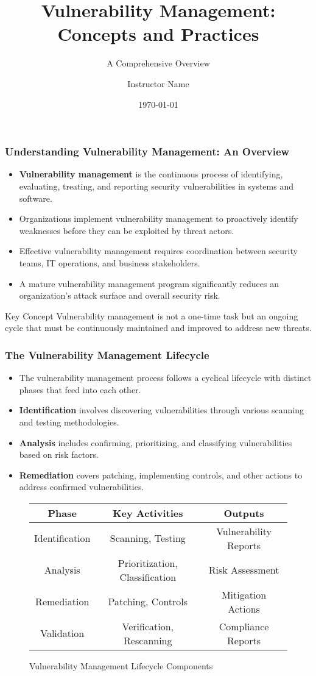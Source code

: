 \documentclass{beamer}
\title{Vulnerability Management: Concepts and Practices}
\subtitle{A Comprehensive Overview}
\author{Instructor Name}
\institute{Institution Name}
\date{\today}
\begin{document}
\begin{frame}
\titlepage
\end{frame}

\begin{frame}
\frametitle{Understanding Vulnerability Management: An Overview}
\begin{itemize}
\item \textbf{Vulnerability management} is the continuous process of identifying, evaluating, treating, and reporting security vulnerabilities in systems and software.
\item Organizations implement vulnerability management to proactively identify weaknesses before they can be exploited by threat actors.
\item Effective vulnerability management requires coordination between security teams, IT operations, and business stakeholders.
\item A mature vulnerability management program significantly reduces an organization's attack surface and overall security risk.
\end{itemize}

\begin{alertblock}{Key Concept}
Vulnerability management is not a one-time task but an ongoing cycle that must be continuously maintained and improved to address new threats.
\end{alertblock}
\end{frame}

\begin{frame}
\frametitle{The Vulnerability Management Lifecycle}
\begin{itemize}
\item The vulnerability management process follows a cyclical lifecycle with distinct phases that feed into each other.
\item \textbf{Identification} involves discovering vulnerabilities through various scanning and testing methodologies.
\item \textbf{Analysis} includes confirming, prioritizing, and classifying vulnerabilities based on risk factors.
\item \textbf{Remediation} covers patching, implementing controls, and other actions to address confirmed vulnerabilities.
\end{itemize}

\begin{figure}
\scriptsize
\centering
\begin{tabular}{|c|c|c|}
\hline
\textbf{Phase} & \textbf{Key Activities} & \textbf{Outputs} \\
\hline
Identification & Scanning, Testing & Vulnerability Reports \\
\hline
Analysis & Prioritization, Classification & Risk Assessment \\
\hline
Remediation & Patching, Controls & Mitigation Actions \\
\hline
Validation & Verification, Rescanning & Compliance Reports \\
\hline
\end{tabular}
\caption{Vulnerability Management Lifecycle Components}
\end{figure}
\end{frame}
\end{document}

